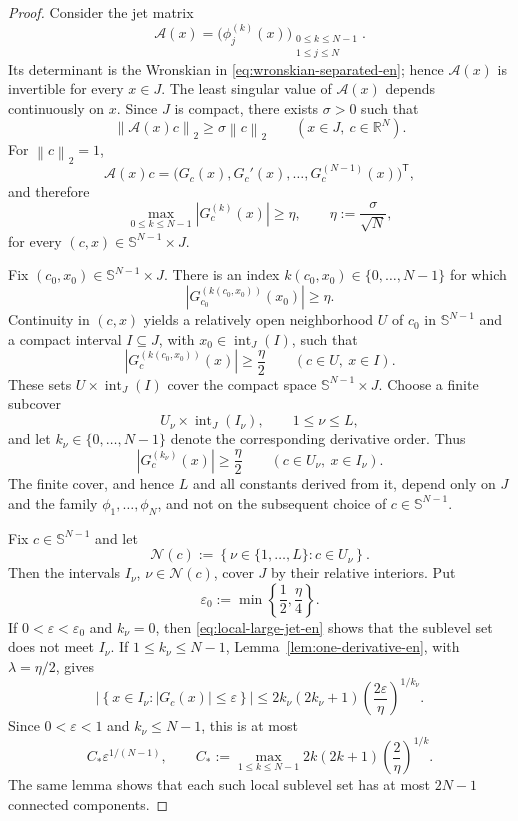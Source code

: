 \documentclass[11pt]{amsart}
\numberwithin{equation}{section}
\theoremstyle{definition}
\theoremstyle{remark}
\newcommand{\R}{\mathbb R}
\newcommand{\Int}{\operatorname{int}}
\newcommand{\norm}[1]{\left\lVert #1\right\rVert}
\newcommand{\abs}[1]{\left\lvert #1\right\rvert}
\newcommand{\set}[1]{\left\{#1\right\}}
\newcommand{\eps}{\varepsilon}
\begin{document}
\begin{proof}
Consider the jet matrix
\[
\mathcal A(x)
=
\bigl(\phi_j^{(k)}(x)\bigr)_{
\substack{0\leq k\leq N-1\\1\leq j\leq N}}.
\]
Its determinant is the Wronskian in
\eqref{eq:wronskian-separated-en}; hence $\mathcal A(x)$ is invertible
for every $x\in J$. The least singular value of $\mathcal A(x)$
depends continuously on $x$. Since $J$ is compact, there exists
$\sigma>0$ such that
\begin{equation}\label{eq:uniform-singular-value-en}
\norm{\mathcal A(x)c}_2\geq\sigma\norm{c}_2
\qquad(x\in J,\ c\in\R^N).
\end{equation}
For $\norm{c}_2=1$,
\[
\mathcal A(x)c
=
\bigl(G_c(x),G_c'(x),\ldots,G_c^{(N-1)}(x)\bigr)^{\mathsf T},
\]
and therefore
\[
\max_{0\leq k\leq N-1}\abs{G_c^{(k)}(x)}
\geq
\eta,
\qquad
\eta:=\frac{\sigma}{\sqrt N},
\]
for every $(c,x)\in\mathbb S^{N-1}\times J$.

Fix $(c_0,x_0)\in\mathbb S^{N-1}\times J$. There is an index
$k(c_0,x_0)\in\{0,\ldots,N-1\}$ for which
\[
\abs{G_{c_0}^{(k(c_0,x_0))}(x_0)}\geq\eta.
\]
Continuity in $(c,x)$ yields a relatively open neighborhood $U$ of
$c_0$ in $\mathbb S^{N-1}$ and a compact interval $I\subseteq J$,
with $x_0\in\Int_J(I)$, such that
\[
\abs{G_c^{(k(c_0,x_0))}(x)}\geq\frac{\eta}{2}
\qquad(c\in U,\ x\in I).
\]
These sets $U\times\Int_J(I)$ cover the compact space
$\mathbb S^{N-1}\times J$. Choose a finite subcover
\[
U_\nu\times\Int_J(I_\nu),
\qquad1\leq\nu\leq L,
\]
and let $k_\nu\in\{0,\ldots,N-1\}$ denote the corresponding derivative
order. Thus
\begin{equation}\label{eq:local-large-jet-en}
\abs{G_c^{(k_\nu)}(x)}\geq\frac{\eta}{2}
\qquad(c\in U_\nu,\ x\in I_\nu).
\end{equation}
The finite cover, and hence $L$ and all constants derived from it,
depend only on $J$ and the family $\phi_1,\ldots,\phi_N$, and not on
the subsequent choice of $c\in\mathbb S^{N-1}$.

Fix $c\in\mathbb S^{N-1}$ and let
\[
\mathcal N(c):=\set{\nu\in\{1,\ldots,L\}:c\in U_\nu}.
\]
Then the intervals $I_\nu$, $\nu\in\mathcal N(c)$, cover $J$ by their
relative interiors. Put
\[
\eps_0:=\min\left\{\frac12,\frac{\eta}{4}\right\}.
\]
If $0<\eps<\eps_0$ and $k_\nu=0$, then
\eqref{eq:local-large-jet-en} shows that the sublevel set does not meet
$I_\nu$. If $1\leq k_\nu\leq N-1$, Lemma~\ref{lem:one-derivative-en},
with $\lambda=\eta/2$, gives
\[
\left|\set{x\in I_\nu:\abs{G_c(x)}\leq\eps}\right|
\leq
2k_\nu(2k_\nu+1)
\left(\frac{2\eps}{\eta}\right)^{1/k_\nu}.
\]
Since $0<\eps<1$ and $k_\nu\leq N-1$, this is at most
\[
C_*\eps^{1/(N-1)},
\qquad
C_*:=
\max_{1\leq k\leq N-1}
2k(2k+1)\left(\frac{2}{\eta}\right)^{1/k}.
\]
The same lemma shows that each such local sublevel set has at most
$2N-1$ connected components.


\end{proof}
\end{document}
